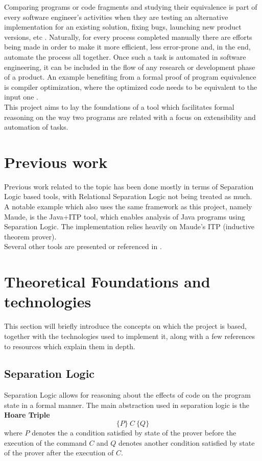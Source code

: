 \documentclass[12pt,a4paper]{article}
\begin{document}
Comparing programs or code fragments and studying their equivalence is part of every software engineer's activities when they are testing an alternative implementation for an existing solution, fixing bugs, launching new product versions, etc . Naturally, for every process completed manually there are efforts being made in order to make it more efficient, less error-prone and, in the end, automate the process all together. Once such a task is automated in software engineering, it can be included in the flow of any research or development phase of a product. An example benefiting from a formal proof of program equivalence is compiler optimization, where the optimized code needs to be equivalent to the input one . \\

This project aims to lay the foundations of a tool which facilitates formal reasoning on the way two programs are related with a focus on extensibility and automation of tasks.

\section{Previous work}
Previous work related to the topic has been done mostly in terms of Separation Logic based tools, with Relational Separation Logic not being treated as much. \\

A notable example which also uses the same framework as this project, namely Maude, is the Java+ITP\cite{JAVAITP} tool, which enables analysis of Java programs using Separation Logic. The implementation relies heavily on Maude's ITP (inductive theorem prover).
\\

Several other tools are presented or referenced in \cite{primer} .

\section{Theoretical Foundations and technologies}
This section will briefly introduce the concepts on which the project is based, together with the technologies used to implement it, along with a few references to resources which explain them in depth.
\subsection{Separation Logic}
Separation Logic allows for reasoning about the effects of code on the program state in a formal manner. The main abstraction used in separation logic is the \textbf{Hoare Triple}
\[ \{P\}\  C\  \{Q\} \]
where \(P\) denotes the a condition satisfied by state of the prover before the execution of the command \(C\) and \(Q\) denotes another condition satisfied by state of the prover after the execution of \(C\).
\\
\end{document}
